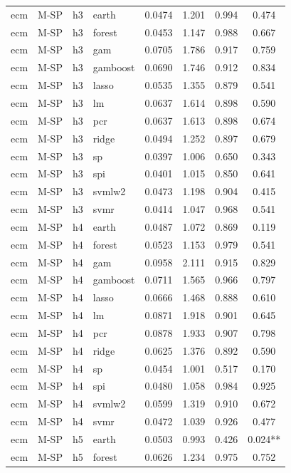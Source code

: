 \begin{ThreePartTable}
\begin{longtable}[t]{llclcccc}
\addlinespace
ecm & M-SP & h3 & earth & 0.0474 & 1.201 & 0.994 & 0.474\\
ecm & M-SP & h3 & forest & 0.0453 & 1.147 & 0.988 & 0.667\\
ecm & M-SP & h3 & gam & 0.0705 & 1.786 & 0.917 & 0.759\\
ecm & M-SP & h3 & gamboost & 0.0690 & 1.746 & 0.912 & 0.834\\
ecm & M-SP & h3 & lasso & 0.0535 & 1.355 & 0.879 & 0.541\\
ecm & M-SP & h3 & lm & 0.0637 & 1.614 & 0.898 & 0.590\\
ecm & M-SP & h3 & pcr & 0.0637 & 1.613 & 0.898 & 0.674\\
ecm & M-SP & h3 & ridge & 0.0494 & 1.252 & 0.897 & 0.679\\
ecm & M-SP & h3 & sp & 0.0397 & 1.006 & 0.650 & 0.343\\
ecm & M-SP & h3 & spi & 0.0401 & 1.015 & 0.850 & 0.641\\
ecm & M-SP & h3 & svmlw2 & 0.0473 & 1.198 & 0.904 & 0.415\\
ecm & M-SP & h3 & svmr & 0.0414 & 1.047 & 0.968 & 0.541\\
\addlinespace
ecm & M-SP & h4 & earth & 0.0487 & 1.072 & 0.869 & 0.119\\
ecm & M-SP & h4 & forest & 0.0523 & 1.153 & 0.979 & 0.541\\
ecm & M-SP & h4 & gam & 0.0958 & 2.111 & 0.915 & 0.829\\
ecm & M-SP & h4 & gamboost & 0.0711 & 1.565 & 0.966 & 0.797\\
ecm & M-SP & h4 & lasso & 0.0666 & 1.468 & 0.888 & 0.610\\
ecm & M-SP & h4 & lm & 0.0871 & 1.918 & 0.901 & 0.645\\
ecm & M-SP & h4 & pcr & 0.0878 & 1.933 & 0.907 & 0.798\\
ecm & M-SP & h4 & ridge & 0.0625 & 1.376 & 0.892 & 0.590\\
ecm & M-SP & h4 & sp & 0.0454 & 1.001 & 0.517 & 0.170\\
ecm & M-SP & h4 & spi & 0.0480 & 1.058 & 0.984 & 0.925\\
ecm & M-SP & h4 & svmlw2 & 0.0599 & 1.319 & 0.910 & 0.672\\
ecm & M-SP & h4 & svmr & 0.0472 & 1.039 & 0.926 & 0.477\\
\addlinespace
ecm & M-SP & h5 & earth & 0.0503 & 0.993 & 0.426 & 0.024**\\
ecm & M-SP & h5 & forest & 0.0626 & 1.234 & 0.975 & 0.752\\

\end{longtable}
\end{ThreePartTable}
